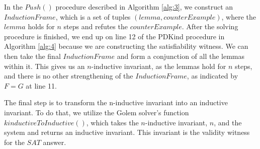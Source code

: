 In the $Push()$ procedure described in Algorithm
\ref{alg:3}, we construct an \\ 
\(Induction Frame\), which is a set of tuples \((lemma, counterExample)\), where the
\( lemma \) holds for \( n \) steps and refutes the
\( counterExample \). After the solving procedure is finished, we end up on
line 12 of the PDKind procedure in Algorithm \ref{alg:4}
because we are constructing the satisfiability
witness. We can then take the final \( Induction Frame \) and form a
conjunction of all the lemmas within it. This gives us an \( n \)-inductive
invariant, as the lemmas hold for \( n \) steps, and there is no other
strengthening of the \( Induction Frame \), as indicated by \( F = G \) at
line 11.

The final step is to transform the n-inductive invariant into an inductive
invariant. To do that, we utilize the Golem solver's function
\( kinductiveToInductive() \), which takes the \( n \)-inductive invariant,
\( n \), and the system and returns an inductive invariant. This invariant
is the validity witness for the \( SAT \) answer.

